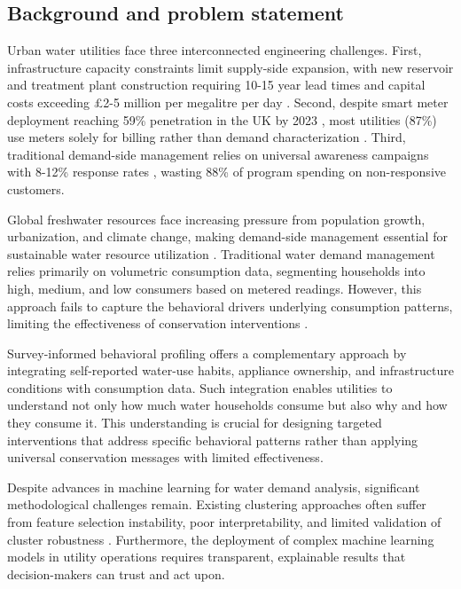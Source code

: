 \documentclass[a4paper,12pt]{article}
\begin{document}
\subsection{Background and problem statement}
Urban water utilities face three interconnected engineering challenges. 
First, infrastructure capacity constraints limit supply-side expansion, 
with new reservoir and treatment plant construction requiring 10-15 year 
lead times and capital costs exceeding £2-5 million per megalitre per day 
\citep{UKWIR2021}. Second, despite smart meter deployment reaching 59\% 
penetration in the UK by 2023 \citep{Ofwat2023}, most utilities (87\%) use 
meters solely for billing rather than demand characterization \citep{WaterUK2022}. 
Third, traditional demand-side management relies on universal 
awareness campaigns with 8-12\% response rates \citep{Willis2011}, 
wasting 88\% of program spending on non-responsive customers.

Global freshwater resources face increasing pressure from population growth, urbanization, and climate change, making demand-side management essential for sustainable water resource utilization \citep{Gleick2018}. Traditional water demand management relies primarily on volumetric consumption data, segmenting households into high, medium, and low consumers based on metered readings. However, this approach fails to capture the behavioral drivers underlying consumption patterns, limiting the effectiveness of conservation interventions \citep{Beal2013}.

Survey-informed behavioral profiling offers a complementary approach by integrating self-reported water-use habits, appliance ownership, and infrastructure conditions with consumption data. Such integration enables utilities to understand not only how much water households consume but also why and how they consume it. This understanding is crucial for designing targeted interventions that address specific behavioral patterns rather than applying universal conservation messages with limited effectiveness.

Despite advances in machine learning for water demand analysis, significant methodological challenges remain. Existing clustering approaches often suffer from feature selection instability, poor interpretability, and limited validation of cluster robustness \citep{Cominola2015}. Furthermore, the deployment of complex machine learning models in utility operations requires transparent, explainable results that decision-makers can trust and act upon.
\end{document}

